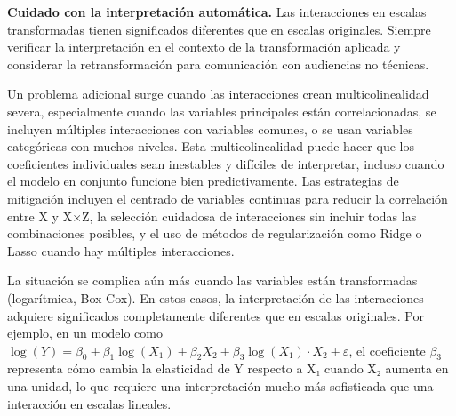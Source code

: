 \documentclass[
  letterpaper,
  DIV=11,
  numbers=noendperiod]{scrreprt}
\begin{document}
\begin{tcolorbox}[enhanced jigsaw, leftrule=.75mm, breakable, colbacktitle=quarto-callout-warning-color!10!white, bottomrule=.15mm, colframe=quarto-callout-warning-color-frame, toprule=.15mm, colback=white, coltitle=black, bottomtitle=1mm, left=2mm, title=\textcolor{quarto-callout-warning-color}{\faExclamationTriangle}\hspace{0.5em}{Advertencia sobre interpretación}, opacityback=0, arc=.35mm, opacitybacktitle=0.6, toptitle=1mm, titlerule=0mm, rightrule=.15mm]

\textbf{Cuidado con la interpretación automática.} Las interacciones en
escalas transformadas tienen significados diferentes que en escalas
originales. Siempre verificar la interpretación en el contexto de la
transformación aplicada y considerar la retransformación para
comunicación con audiencias no técnicas.

\end{tcolorbox}

Un problema adicional surge cuando las interacciones crean
multicolinealidad severa, especialmente cuando las variables principales
están correlacionadas, se incluyen múltiples interacciones con variables
comunes, o se usan variables categóricas con muchos niveles. Esta
multicolinealidad puede hacer que los coeficientes individuales sean
inestables y difíciles de interpretar, incluso cuando el modelo en
conjunto funcione bien predictivamente. Las estrategias de mitigación
incluyen el centrado de variables continuas para reducir la correlación
entre X y X×Z, la selección cuidadosa de interacciones sin incluir todas
las combinaciones posibles, y el uso de métodos de regularización como
Ridge o Lasso cuando hay múltiples interacciones.

La situación se complica aún más cuando las variables están
transformadas (logarítmica, Box-Cox). En estos casos, la interpretación
de las interacciones adquiere significados completamente diferentes que
en escalas originales. Por ejemplo, en un modelo como
\(\log(Y) = \beta_0 + \beta_1 \log(X_1) + \beta_2 X_2 + \beta_3 \log(X_1) \cdot X_2 + \varepsilon\),
el coeficiente \(\beta_3\) representa cómo cambia la elasticidad de Y
respecto a X₁ cuando X₂ aumenta en una unidad, lo que requiere una
interpretación mucho más sofisticada que una interacción en escalas
lineales.
\end{document}
